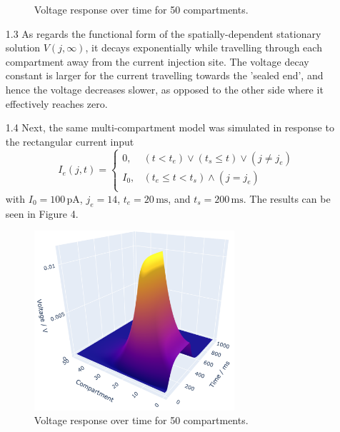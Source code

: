 \documentclass[12pt]{article}
\begin{document}
\begin{enumerate}
\begin{figure}[h]
        \caption{Voltage response over time for 50 compartments.}
    \end{figure}
    \item[1.3] As regards the functional form of the spatially-dependent stationary solution $V(j, \infty)$, it 
    decays exponentially while travelling through each compartment away from the current injection site. The voltage decay 
    constant is larger for the current travelling towards the 'sealed end', and hence the voltage decreases slower, as opposed 
    to the other side where it effectively reaches zero.
    \item[1.4] Next, the same multi-compartment model was simulated in response to the rectangular current input
    \begin{equation} \label{eq2}
        I_{e}(j, t)= 
        \begin{cases}
            0, & (t < t_{e}) \vee (t_{s} \leqslant t) \vee (j \neq j_{e})\\
            I_{0}, & (t_{e} \leqslant t < t_{s}) \wedge (j = j_{e})\\
        \end{cases}
    \end{equation}
    with $I_{0}=100 \, \text{pA}$, $j_{e}=14$, $t_{e}=20 \, \text{ms}$, and $t_{s}=200 \, \text{ms}$. The results can be seen in Figure 4.
    \begin{figure}[h]
        \centering
        \includegraphics[width=0.7\textwidth]{Figures/fig2_3d.png}
        \caption{Voltage response over time for 50 compartments.}
    \end{figure}
\end{enumerate}
\end{document}
